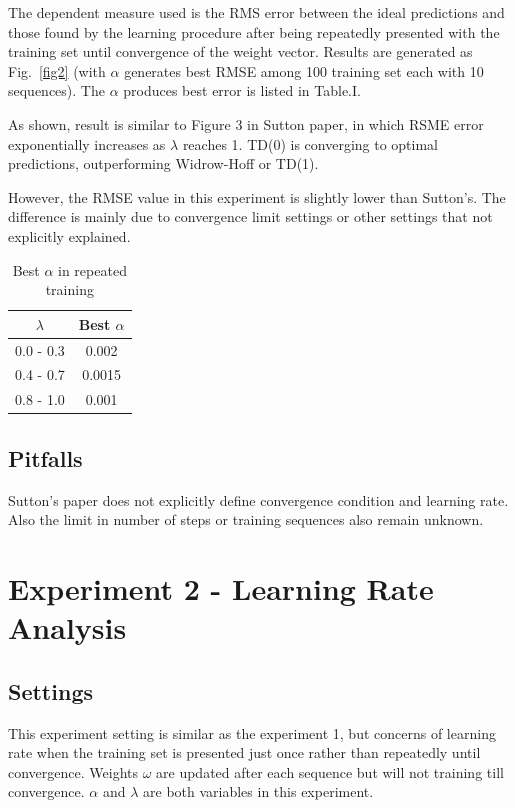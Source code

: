 \documentclass[conference]{IEEEtran}
\begin{document}
The dependent measure used is the RMS error between the ideal predictions and those found by the learning procedure after being repeatedly presented with the training set until convergence of the weight vector. Results are generated as Fig.~\ref{fig2} (with $\alpha$ generates best RMSE among 100 training set each with 10 sequences). The $\alpha$ produces best error is listed in Table.I.

As shown, result is similar to Figure 3 in Sutton paper, in which RSME error exponentially increases as $\lambda$ reaches 1. TD(0) is converging to optimal predictions, outperforming Widrow-Hoff or TD(1).

However, the RMSE value in this experiment is slightly lower than Sutton's. The difference is mainly due to convergence limit settings or other settings that not explicitly explained.

\begin{table}
\begin{center}
 \begin{tabular}{||c c ||} 
 \hline
 $\lambda$ & Best $\alpha$ \\ [0.5ex] 
 \hline\hline
 0.0 - 0.3  & 0.002  \\
 \hline
 0.4 - 0.7  & 0.0015  \\
 \hline
 0.8 - 1.0 & 0.001  \\ [1ex]
 \hline
\end{tabular}
\end{center}
 \caption{Best $\alpha$ in repeated training}
\end{table}

\subsection{Pitfalls}

Sutton's paper does not explicitly define convergence condition and learning rate. Also the limit in number of steps or training sequences also remain unknown.

\section{Experiment 2 - Learning Rate Analysis}\label{sec:2}

\subsection{Settings}
This experiment setting is similar as the experiment 1, but concerns of learning rate when the training set is presented just once rather than repeatedly until convergence. Weights $\omega$ are updated after each sequence but will not training till convergence. $\alpha$ and $\lambda$ are both variables in this experiment.
\end{document}
